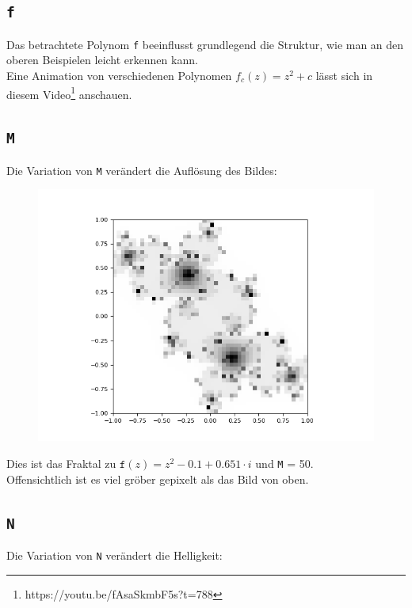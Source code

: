 \documentclass[12pt]{scrartcl}
\begin{document}
\subsection{\texttt{f}}
Das betrachtete Polynom \texttt{f} beeinflusst grundlegend die Struktur, wie man an den oberen Beispielen leicht erkennen kann.\\
Eine Animation von verschiedenen Polynomen $f_c(z) = z^2 + c$ lässt sich in diesem Video\footnote[6]{https://youtu.be/fAsaSkmbF5s?t=788} anschauen.

\subsection{\texttt{M}}
Die Variation von \texttt{M} verändert die Auflösung des Bildes:\\

\begin{figure}[H]
\centering
\includegraphics[scale=0.5]{Atoll1.png}
\caption{}
\label{Atoll1}
\end{figure}

Dies ist das Fraktal zu $\texttt{f}(z) = z^2 - 0.1 + 0.651 \cdot i$ und \texttt{M} = 50.\\
Offensichtlich ist es viel gröber gepixelt als das Bild von oben.

\subsection{\texttt{N}}
Die Variation von \texttt{N} verändert die Helligkeit:\\
\end{document}
